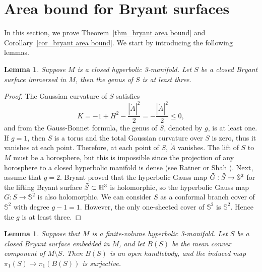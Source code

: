 \documentclass[12pt,a4paper]{amsart}
\numberwithin{equation}{section}
\theoremstyle{plain}
\newtheorem{Lemma}[Th]{Lemma}
\theoremstyle{named}
\theoremstyle{definition}
\begin{document}
\section{Area bound for Bryant surfaces}\label{section_bryant}
In this section, we prove Theorem~\ref{thm_bryant area bound} and Corollary~\ref{cor_bryant area bound}. We start by introducing the following lemmas.

\begin{Lemma}\label{thm_genus>2}
Suppose $M$ is a closed hyperbolic 3-manifold.
    Let $S$ be a closed Bryant surface immersed in $M$, then the genus of $S$ is at least three.
\end{Lemma}

\begin{proof}

    The Gaussian curvature of $S$ satisfies \begin{equation}\label{equ_gaussian}
        K=-1+H^2-\frac{|\mathring{A}|^2}{2}=-\frac{|\mathring{A}|^2}{2}\leq 0,
    \end{equation} 
    and from the Gauss-Bonnet formula, the genus of $S$, denoted by $g$, is at least one. If $g=1$, then $S$ is a torus and the total Gaussian curvature over $S$ is zero, thus it vanishes at each point. Therefore, at each point of $S$, $\mathring{A}$ vanishes. The lift of $S$ to $M$ must be a horosphere, but this is impossible since the projection of any horosphere to a closed hyperbolic manifold is dense (see Ratner \cite{Ratner} or Shah \cite{Shah}).
    Next, assume that $g=2$. Bryant \cite{Bryant} proved that the hyperbolic Gauss map $\Tilde{G}: \Tilde{S}\rightarrow \mathbb{S}^2$ for the lifting Bryant surface $\Tilde{S}\subset\mathbb{H}^3$ is holomorphic, so the hyperbolic Gauss map $G:S\rightarrow \mathbb{S}^2$ is also holomorphic. We can consider $S$ as a conformal branch cover of $\mathbb{S}^2$ with degree $g-1=1$. However, the only one-sheeted cover of $\mathbb{S}^2$ is $\mathbb{S}^2$. Hence the $g$ is at least three. 
\end{proof}

\begin{Lemma}\label{thm_handlebody}
Suppose that $M$ is a finite-volume hyperbolic 3-manifold.
    Let $S$ be a closed Bryant surface embedded in $M$, and let $B(S)$ be the mean convex component of $M\setminus S$. Then $B(S)$ is an open handlebody, and the induced map $\pi_1(S)\rightarrow \pi_1(B(S))$ is surjective.
\end{Lemma}
\end{document}
